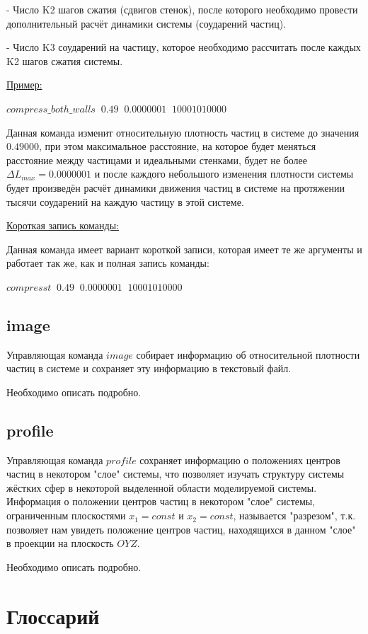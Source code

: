 \documentclass[a4paper]{article}
\begin{document}
- Число K2 шагов сжатия (сдвигов стенок), после которого необходимо провести дополнительный расчёт динамики системы (соударений частиц).

- Число K3 соударений на частицу, которое необходимо рассчитать после каждых K2 шагов сжатия системы.

\uline{Пример:}

$ compress\_both\_walls \;\; 0.49 \;\; 0.0000001 \;\; 1000 10 10000 $

Данная команда изменит относительную плотность частиц в системе до значения $ 0.49000 $, при этом максимальное расстояние, на которое будет меняться расстояние между частицами и идеальными стенками, будет не более $ \Delta L_{max} = 0.0000001 $ и после каждого небольшого изменения плотности системы будет произведён расчёт динамики движения частиц в системе на протяжении тысячи соударений на каждую частицу в этой системе.

\uline{Короткая запись команды:}

Данная команда имеет вариант короткой записи, которая имеет те же аргументы и работает так же, как и полная запись команды:

$ compresst \;\; 0.49 \;\; 0.0000001 \;\; 1000 10 10000 $


\subsection{image}

Управляющая команда $ image $ собирает информацию об относительной плотности частиц в системе и сохраняет эту информацию в текстовый файл.

Необходимо описать подробно.


\subsection{profile}

Управляющая команда $ profile $ сохраняет информацию о положениях центров частиц в некотором "слое" системы, что позволяет изучать структуру системы жёстких сфер в некоторой выделенной области моделируемой системы. Информация о положении центров частиц в некотором "слое" системы, ограниченным плоскостями $ x_1 = const $ и $ x_2 = const $, называется "разрезом", т.к. позволяет нам увидеть положение центров частиц, находящихся в данном "слое" в проекции на плоскость $ OYZ $.

Необходимо описать подробно.

\newpage
\section{Глоссарий}
\end{document}
